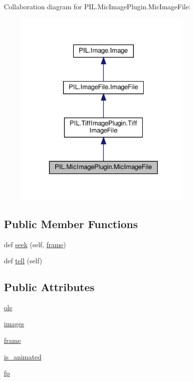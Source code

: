 Collaboration diagram for P\+I\+L.\+Mic\+Image\+Plugin.\+Mic\+Image\+File\+:
\nopagebreak
\begin{figure}[H]
\begin{center}
\leavevmode
\includegraphics[width=246pt]{classPIL_1_1MicImagePlugin_1_1MicImageFile__coll__graph}
\end{center}
\end{figure}
\subsection*{Public Member Functions}
\begin{DoxyCompactItemize}
\item 
def \hyperlink{classPIL_1_1MicImagePlugin_1_1MicImageFile_a2f2ac12b6b6e4bbe36722bc077e908f5}{seek} (self, \hyperlink{classPIL_1_1MicImagePlugin_1_1MicImageFile_ad258339061fcf4f4ea0982478bd2af94}{frame})
\item 
def \hyperlink{classPIL_1_1MicImagePlugin_1_1MicImageFile_a7a6b8dc54d3a9a0320122c30a9bab012}{tell} (self)
\end{DoxyCompactItemize}
\subsection*{Public Attributes}
\begin{DoxyCompactItemize}
\item 
\hyperlink{classPIL_1_1MicImagePlugin_1_1MicImageFile_ad963ac3b329f284367a9c2ea609e22f0}{ole}
\item 
\hyperlink{classPIL_1_1MicImagePlugin_1_1MicImageFile_a27a1016857ed2561cd5d51046b0859dd}{images}
\item 
\hyperlink{classPIL_1_1MicImagePlugin_1_1MicImageFile_ad258339061fcf4f4ea0982478bd2af94}{frame}
\item 
\hyperlink{classPIL_1_1MicImagePlugin_1_1MicImageFile_aa28dffb7b5aa3fb6917e573849100533}{is\+\_\+animated}
\item 
\hyperlink{classPIL_1_1MicImagePlugin_1_1MicImageFile_acdd1ba966b9ec803470f0722064d9ebb}{fp}
\end{DoxyCompactItemize}
